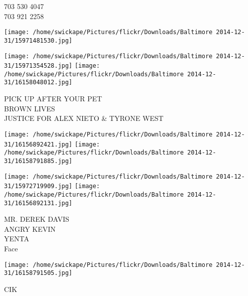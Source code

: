 \documentclass[10pt,letterpaper]{article}
\begin{document}
703 530 4047\\
703 921 2258\\
\pagebreak

\texttt{[image: /home/swickape/Pictures/flickr/Downloads/Baltimore 2014-12-31/15971481530.jpg]}

\vspace{0.25in}
\texttt{[image: /home/swickape/Pictures/flickr/Downloads/Baltimore 2014-12-31/15971354528.jpg]}
\texttt{[image: /home/swickape/Pictures/flickr/Downloads/Baltimore 2014-12-31/16158048012.jpg]}

PICK UP AFTER YOUR PET\\
BROWN LIVES\\
JUSTICE FOR ALEX NIETO \& TYRONE WEST\\
\pagebreak

\texttt{[image: /home/swickape/Pictures/flickr/Downloads/Baltimore 2014-12-31/16156892421.jpg]}
\texttt{[image: /home/swickape/Pictures/flickr/Downloads/Baltimore 2014-12-31/16158791885.jpg]}

\texttt{[image: /home/swickape/Pictures/flickr/Downloads/Baltimore 2014-12-31/15972719909.jpg]}
\texttt{[image: /home/swickape/Pictures/flickr/Downloads/Baltimore 2014-12-31/16156892131.jpg]}

MR. DEREK DAVIS\\
ANGRY KEVIN\\
YENTA\\
Face\\
\pagebreak

\texttt{[image: /home/swickape/Pictures/flickr/Downloads/Baltimore 2014-12-31/16158791505.jpg]}

CIK\\
\pagebreak
\end{document}

